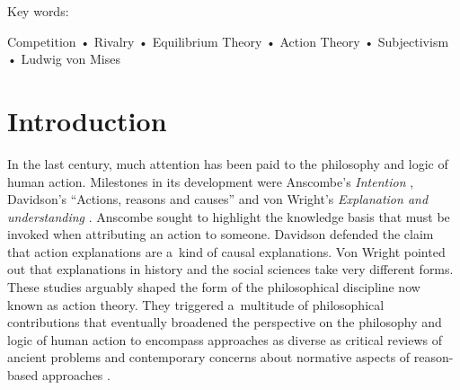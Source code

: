 Key words:



Competition • Rivalry • Equilibrium Theory • Action Theory • Subjectivism • Ludwig von Mises



\section{Introduction}

In the last century, much attention has been paid to the philosophy and logic of human action. Milestones in its development were Anscombe's \textit{Intention} 
\parencite*[][]{}, %
 Davidson's ``Actions, reasons and causes'' 
\parencite*[][]{} %
 and von Wright's \textit{Explanation and understanding} 
\parencite*[][]{}. %
 Anscombe sought to highlight the knowledge basis that must be invoked when attributing an action to someone. Davidson defended the claim that action explanations are a~kind of causal explanations. Von Wright pointed out that explanations in history and the social sciences take very different forms. These studies arguably shaped the form of the philosophical discipline now known as action theory. They triggered a~multitude of philosophical contributions that eventually broadened the perspective on the philosophy and logic of human action to encompass approaches as diverse as critical reviews of ancient problems 
\parencites[such as the problem of weakness of will, cf., e.g.,][]{mele_weakness_2010}[][]{walker_problem_1989}[][]{davidson_actions_2001} %
 and contemporary concerns about normative aspects of reason-based approaches 
\parencites[such as patient autonomy in medical ethics and related problems, cf., e.g.,][]{zambrano_patient_2017}[][]{flanigan_obstetric_2016}[][]{jennings_agency_2009}. %

